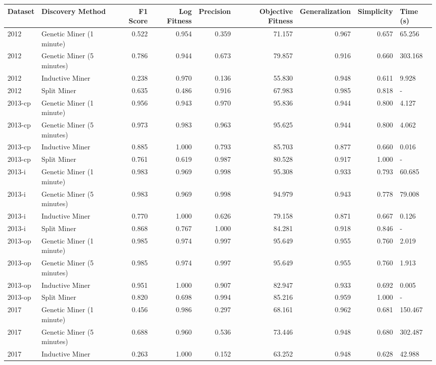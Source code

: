 \begin{tabular}{llrrrrrrl}
\toprule
Dataset & Discovery Method & F1 Score & Log Fitness & Precision & Objective Fitness & Generalization & Simplicity & Time (s) \\
\midrule
2012 & Genetic Miner (1 minute) & 0.522 & 0.954 & 0.359 & 71.157 & 0.967 & 0.657 & 65.256 \\
2012 & Genetic Miner (5 minutes) & 0.786 & 0.944 & 0.673 & 79.857 & 0.916 & 0.660 & 303.168 \\
2012 & Inductive Miner & 0.238 & 0.970 & 0.136 & 55.830 & 0.948 & 0.611 & 9.928 \\
2012 & Split Miner & 0.635 & 0.486 & 0.916 & 67.983 & 0.985 & 0.818 & - \\
2013-cp & Genetic Miner (1 minute) & 0.956 & 0.943 & 0.970 & 95.836 & 0.944 & 0.800 & 4.127 \\
2013-cp & Genetic Miner (5 minutes) & 0.973 & 0.983 & 0.963 & 95.625 & 0.944 & 0.800 & 4.062 \\
2013-cp & Inductive Miner & 0.885 & 1.000 & 0.793 & 85.703 & 0.877 & 0.660 & 0.016 \\
2013-cp & Split Miner & 0.761 & 0.619 & 0.987 & 80.528 & 0.917 & 1.000 & - \\
2013-i & Genetic Miner (1 minute) & 0.983 & 0.969 & 0.998 & 95.308 & 0.933 & 0.793 & 60.685 \\
2013-i & Genetic Miner (5 minutes) & 0.983 & 0.969 & 0.998 & 94.979 & 0.943 & 0.778 & 79.008 \\
2013-i & Inductive Miner & 0.770 & 1.000 & 0.626 & 79.158 & 0.871 & 0.667 & 0.126 \\
2013-i & Split Miner & 0.868 & 0.767 & 1.000 & 84.281 & 0.918 & 0.846 & - \\
2013-op & Genetic Miner (1 minute) & 0.985 & 0.974 & 0.997 & 95.649 & 0.955 & 0.760 & 2.019 \\
2013-op & Genetic Miner (5 minutes) & 0.985 & 0.974 & 0.997 & 95.649 & 0.955 & 0.760 & 1.913 \\
2013-op & Inductive Miner & 0.951 & 1.000 & 0.907 & 82.947 & 0.933 & 0.692 & 0.005 \\
2013-op & Split Miner & 0.820 & 0.698 & 0.994 & 85.216 & 0.959 & 1.000 & - \\
2017 & Genetic Miner (1 minute) & 0.456 & 0.986 & 0.297 & 68.161 & 0.962 & 0.681 & 150.467 \\
2017 & Genetic Miner (5 minutes) & 0.688 & 0.960 & 0.536 & 73.446 & 0.948 & 0.680 & 302.487 \\
2017 & Inductive Miner & 0.263 & 1.000 & 0.152 & 63.252 & 0.948 & 0.628 & 42.988 \\

\end{tabular}
